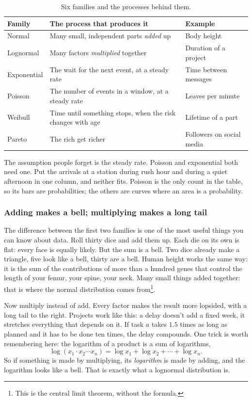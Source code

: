 \documentclass[12pt, a4paper]{article}
\theoremstyle{definition}
\theoremstyle{remark}
\begin{document}
\begin{table}[H]
\centering
\begin{tabularx}{\textwidth}{@{}l X l@{}}
\toprule
\textbf{Family} & \textbf{The process that produces it} & \textbf{Example} \\
\midrule
Normal & Many small, independent parts \emph{added} up & Body height \\
Lognormal & Many factors \emph{multiplied} together & Duration of a project \\
Exponential & The wait for the next event, at a steady rate & Time between messages \\
Poisson & The number of events in a window, at a steady rate & Leaves per minute \\
Weibull & Time until something stops, when the risk changes with age & Lifetime of a part \\
Pareto & The rich get richer & Followers on social media \\
\bottomrule
\end{tabularx}
\caption{Six families and the processes behind them.}
\label{tab:families}
\end{table}

The assumption people forget is the steady rate. Poisson and exponential both need one. Put the arrivals at a station during rush hour and during a quiet afternoon in one column, and neither fits. Poisson is the only count in the table, so its bars are probabilities; the others are curves where an area is a probability.

\subsubsection{Adding makes a bell; multiplying makes a long tail}
The difference between the first two families is one of the most useful things you can know about data. Roll thirty dice and add them up. Each die on its own is flat: every face is equally likely. But the sum is a bell. Two dice already make a triangle, five look like a bell, thirty are a bell. Human height works the same way: it is the sum of the contributions of more than a hundred genes that control the length of your femur, your spine, your neck. Many small things added together: that is where the normal distribution comes from\footnote{This is the central limit theorem, without the formula.}.

Now multiply instead of add. Every factor makes the result more lopsided, with a long tail to the right. Projects work like this: a delay doesn't add a fixed week, it stretches everything that depends on it. If task $a$ takes $1.5$ times as long as planned and it has to be done ten times, the delay compounds. One trick is worth remembering here: the logarithm of a product is a sum of logarithms,
$$\log(x_1 \cdot x_2 \cdots x_n) = \log x_1 + \log x_2 + \cdots + \log x_n.$$
So if something is made by multiplying, its \emph{logarithm} is made by adding, and the logarithm looks like a bell. That is exactly what a lognormal distribution is.
\end{document}
